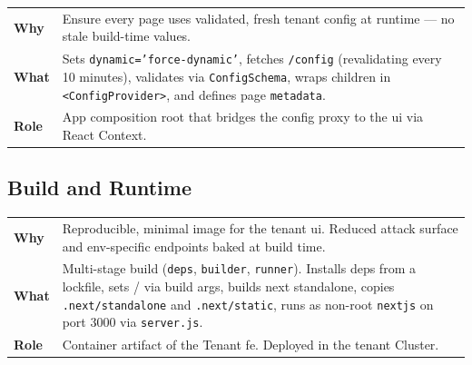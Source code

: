 \documentclass[11pt, a4paper, oneside, listof=totoc]{scrartcl}
\makeatletter
\newcommand{\codesummary}[3]{%
    \vspace{0.4\baselineskip}%
    \noindent\begin{tabularx}{\linewidth}{@{}>{\bfseries}l X@{}}
    Why  & #1\\
    What & #2\\
    Role & #3\\
    \end{tabularx}%
    \vspace{0.2\baselineskip}%
}
\makeatother
\begin{document}
                \codesummary
                    {Ensure every page uses validated, fresh tenant config at runtime --- no stale build-time values.}
                    {Sets \texttt{dynamic='force-dynamic'}, fetches \texttt{/config} (revalidating every 10 minutes), validates via \texttt{ConfigSchema}, wraps children in \texttt{<ConfigProvider>}, and defines page \texttt{metadata}.}
                    {App composition root that bridges the config proxy to the \gls{ui} via React Context.}

        \clearpage

            \subsection{Build and Runtime} 
                \codesummary
                    {Reproducible, minimal image for the tenant \gls{ui}. Reduced attack surface and env-specific endpoints baked at build time.}
                    {Multi-stage build (\texttt{deps}, \texttt{builder}, \texttt{runner}). Installs deps from a lockfile, sets \texttt{\detokenize{CONFIG_ENDPOINT}}/\texttt{\detokenize{CRASH_ENDPOINT}} via build args, builds \gls{next} standalone, copies \texttt{.next/standalone} and \texttt{.next/static}, runs as non-root \texttt{nextjs} on port 3000 via \texttt{server.js}.}
                    {Container artifact of the Tenant \gls{fe}. Deployed in the tenant Cluster.}
\end{document}

